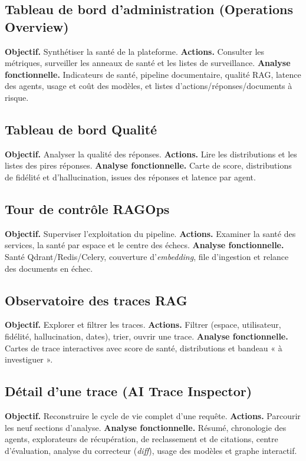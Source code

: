 \subsection{Tableau de bord d'administration (Operations Overview)}
\textbf{Objectif.} Synthétiser la santé de la plateforme. \textbf{Actions.}
Consulter les métriques, surveiller les anneaux de santé et les listes de
surveillance. \textbf{Analyse fonctionnelle.} Indicateurs de santé, pipeline
documentaire, qualité RAG, latence des agents, usage et coût des modèles, et
listes d'actions/réponses/documents à risque.

\subsection{Tableau de bord Qualité}
\textbf{Objectif.} Analyser la qualité des réponses. \textbf{Actions.} Lire les
distributions et les listes des pires réponses. \textbf{Analyse fonctionnelle.}
Carte de score, distributions de fidélité et d'hallucination, issues des réponses
et latence par agent.

\subsection{Tour de contrôle RAGOps}
\textbf{Objectif.} Superviser l'exploitation du pipeline. \textbf{Actions.}
Examiner la santé des services, la santé par espace et le centre des échecs.
\textbf{Analyse fonctionnelle.} Santé Qdrant/Redis/Celery, couverture
d'\emph{embedding}, file d'ingestion et relance des documents en échec.

\subsection{Observatoire des traces RAG}
\textbf{Objectif.} Explorer et filtrer les traces. \textbf{Actions.} Filtrer
(espace, utilisateur, fidélité, hallucination, dates), trier, ouvrir une trace.
\textbf{Analyse fonctionnelle.} Cartes de trace interactives avec score de santé,
distributions et bandeau « à investiguer ».

\subsection{Détail d'une trace (AI Trace Inspector)}
\textbf{Objectif.} Reconstruire le cycle de vie complet d'une requête.
\textbf{Actions.} Parcourir les neuf sections d'analyse. \textbf{Analyse
fonctionnelle.} Résumé, chronologie des agents, explorateurs de récupération, de
reclassement et de citations, centre d'évaluation, analyse du correcteur (\emph{diff}),
usage des modèles et graphe interactif.

